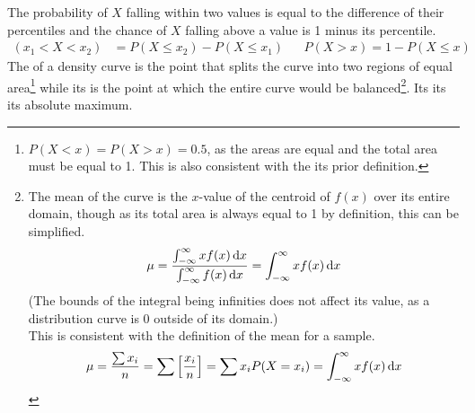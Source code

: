 \documentclass[../AP_Statistics.tex]{subfiles}
\begin{document}
			The probability of $X$ falling within two values is equal to the difference of their percentiles and the chance of $X$ falling above a value is 1 minus its percentile.
			\begin{align*}
				(x_1 < X < x_2) &= P(X \le x_2) - P(X \le x_1) && P(X > x) = 1 - P(X \le x)
			\end{align*}
			The  of a density curve is the point that splits the curve into two regions of equal area\footnote{$P(X < x) = P(X > x) = 0.5$, as the areas are equal and the total area must be equal to 1. This is also consistent with the its prior definition.} while its  is the point at which the entire curve would be balanced\footnote{The mean of the curve is the $x$-value of the centroid of $f(x)$ over its entire domain, though as its total area is always equal to 1 by definition, this can be simplified.\[\mu = \frac{\int_{-\infty}^\infty xf(x)\,\mathrm{d} x}{\int_{-\infty}^\infty f(x)\,\mathrm{d} x} = \int_{-\infty}^\infty xf(x)\,\mathrm{d} x\](The bounds of the integral being infinities does not affect its value, as a distribution curve is 0 outside of its domain.)\\This is consistent with the definition of the mean for a sample.\[\mu = \frac{\sum x_i}{n} = \sum\left[\frac{x_i}{n}\right] = \sum x_iP(X = x_i) = \int_{-\infty}^\infty xf(x)\,\mathrm{d} x\]}. Its  its its absolute maximum.
\end{document}
